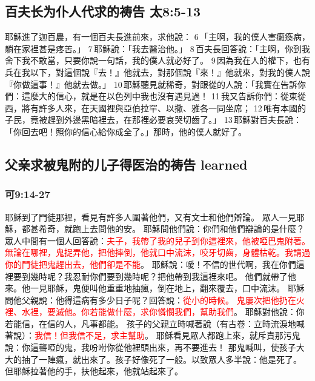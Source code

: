 \subsection{百夫长为仆人代求的祷告 太8:5-13}
耶穌進了迦百農，有一個百夫長進前來，求他說： 6 「主啊，我的僕人害癱瘓病，躺在家裡甚是疼苦。」 7 耶穌說：「我去醫治他。」 8 百夫長回答說：「主啊，你到我舍下我不敢當，只要你說一句話，我的僕人就必好了。 9 因為我在人的權下，也有兵在我以下，對這個說『去！』他就去，對那個說『來！』他就來，對我的僕人說『你做這事！』他就去做。」 10 耶穌聽見就稀奇，對跟從的人說：「我實在告訴你們：這麼大的信心，就是在以色列中我也沒有遇見過！ 11 我又告訴你們：從東從西，將有許多人來，在天國裡與亞伯拉罕、以撒、雅各一同坐席； 12 唯有本國的子民，竟被趕到外邊黑暗裡去，在那裡必要哀哭切齒了。」 13 耶穌對百夫長說：「你回去吧！照你的信心給你成全了。」那時，他的僕人就好了。

\subsection{父亲求被鬼附的儿子得医治的祷告 learned}
\subsubsection{可9:14-27}
耶穌到了門徒那裡，看見有許多人圍著他們，又有文士和他們辯論。
眾人一見耶穌，都甚希奇，就跑上去問他的安。
耶穌問他們說：你們和他們辯論的是什麼？
眾人中間有一個人回答說：\textcolor{red}{夫子，我帶了我的兒子到你這裡來，他被啞巴鬼附著。
無論在哪裡，鬼捉弄他，把他摔倒，他就口中流沫，咬牙切齒，身體枯乾。我請過你的門徒把鬼趕出去，他們卻是不能}。
耶穌說：噯！不信的世代啊，我在你們這裡要到幾時呢？我忍耐你們要到幾時呢？把他帶到我這裡來吧。
他們就帶了他來。他一見耶穌，鬼便叫他重重地抽瘋，倒在地上，翻來覆去，口中流沫。
耶穌問他父親說：他得這病有多少日子呢？回答說：\textcolor{red}{從小的時候。
鬼屢次把他扔在火裡、水裡，要滅他。你若能做什麼，求你憐憫我們，幫助我們}。
耶穌對他說：你若能信，在信的人，凡事都能。
孩子的父親立時喊著說（有古卷：立時流淚地喊著說）：\textcolor{red}{我信！但我信不足，求主幫助}。
耶穌看見眾人都跑上來，就斥責那污鬼說：你這聾啞的鬼，我吩咐你從他裡頭出來，再不要進去！
那鬼喊叫，使孩子大大的抽了一陣瘋，就出來了。孩子好像死了一般。以致眾人多半說：他是死了。
但耶穌拉著他的手，扶他起來，他就站起來了。


